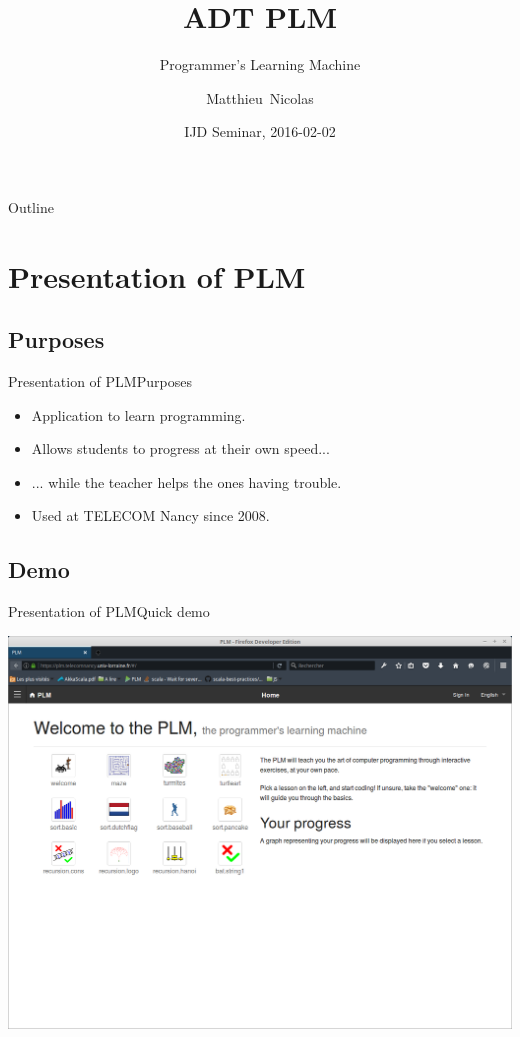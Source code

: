 \documentclass{beamer}
\title{ADT PLM}
\subtitle{Programmer's Learning Machine}
\author{Matthieu~Nicolas}
\date{IJD Seminar, 2016-02-02}
\begin{document}
\begin{frame}
  \titlepage
\end{frame}

\begin{frame}{Outline}
  \tableofcontents
\end{frame}

\section{Presentation of PLM}

\subsection{Purposes}

\begin{frame}{Presentation of PLM}{Purposes}
  \begin{itemize}
  \item {
    Application to learn programming.
    \pause
  }
  \item {
    Allows students to progress at their own speed...
    \pause
  }
  \item {
    ... while the teacher helps the ones having trouble.
    \pause
  }
  \item {
    Used at TELECOM Nancy since 2008.
  }
  \end{itemize}
\end{frame}

\subsection{Demo}

\begin{frame}{Presentation of PLM}{Quick demo}
  \begin{center}
    \href{https://plm.telecomnancy.univ-lorraine.fr}{\includegraphics[scale=0.20]{img/screen-webPLM-1.png}}
  \end{center}
\end{frame}
\end{document}
